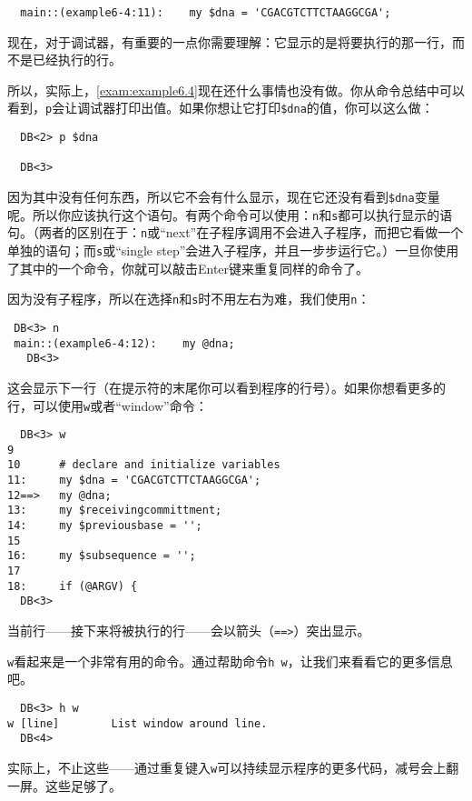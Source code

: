 \begin{lstlisting}
  main::(example6-4:11):    my $dna = 'CGACGTCTTCTAAGGCGA';
\end{lstlisting}

现在，对于调试器，有重要的一点你需要理解：它显示的是将要执行的那一行，而不是已经执行的行。

所以，实际上，\autoref{exam:example6.4}现在还什么事情也没有做。你从命令总结中可以看到，\verb|p|会让调试器打印出值。如果你想让它打印\verb|$dna|的值，你可以这么做：

\begin{lstlisting}
  DB<2> p $dna

  DB<3> 
\end{lstlisting}

因为其中没有任何东西，所以它不会有什么显示，现在它还没有看到\verb|$dna|变量呢。所以你应该执行这个语句。有两个命令可以使用：\verb|n|和\verb|s|都可以执行显示的语句。（两者的区别在于：\verb|n|或“next”在子程序调用不会进入子程序，而把它看做一个单独的语句；而\verb|s|或“single step”会进入子程序，并且一步步运行它。）一旦你使用了其中的一个命令，你就可以敲击Enter键来重复同样的命令了。

因为没有子程序，所以在选择\verb|n|和\verb|s|时不用左右为难，我们使用\verb|n|：

\begin{lstlisting}
 DB<3> n
 main::(example6-4:12):    my @dna;
   DB<3> 
\end{lstlisting}

这会显示下一行（在提示符的末尾你可以看到程序的行号）。如果你想看更多的行，可以使用\verb|w|或者“window”命令：

\begin{lstlisting}
  DB<3> w
9
10      # declare and initialize variables
11:     my $dna = 'CGACGTCTTCTAAGGCGA';
12==>   my @dna;
13:     my $receivingcommittment;
14:     my $previousbase = ''; 
15
16:     my $subsequence = '';
17
18:     if (@ARGV) {
  DB<3>
\end{lstlisting}

当前行——接下来将被执行的行——会以箭头（\verb|==>|）突出显示。

\verb|w|看起来是一个非常有用的命令。通过帮助命令\verb|h w|，让我们来看看它的更多信息吧。

\begin{lstlisting}
  DB<3> h w
w [line]        List window around line.
  DB<4> 
\end{lstlisting}

实际上，不止这些——通过重复键入\verb|w|可以持续显示程序的更多代码，减号会上翻一屏。这些足够了。

